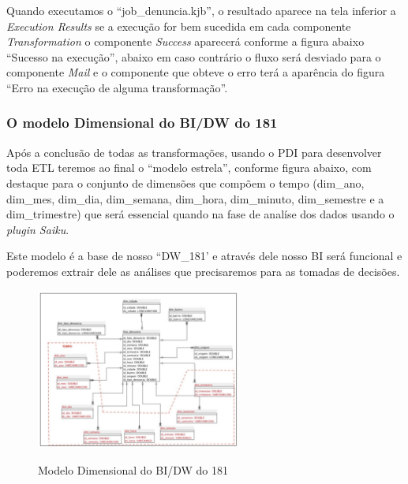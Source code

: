 Quando executamos o ``job\_denuncia.kjb'', o resultado aparece na tela inferior a \textit{Execution Results} se a execu\c{c}\~{a}o 
for bem sucedida em cada componente \textit{Transformation} o  componente \textit{Success} aparecer\'{a} conforme a 
figura abaixo ``Sucesso na execu\c{c}\~{a}o'', abaixo em caso contr\'{a}rio o fluxo ser\'{a} desviado para o 
componente \textit{Mail} e o componente que obteve o erro ter\'{a} a aparência do figura ``Erro na execu\c{c}\~{a}o de 
alguma transforma\c{c}\~{a}o''.

\subsubsection{O modelo Dimensional do BI/DW do 181}

Ap\'os a conclus\~{a}o de todas as transforma\c{c}\~{o}es, usando o PDI para desenvolver toda ETL teremos ao final o ``modelo estrela'', 
conforme figura abaixo, com destaque para o conjunto de dimens\~{o}es que comp\~{o}em o tempo (dim\_ano, dim\_mes, dim\_dia, dim\_semana, 
dim\_hora, dim\_minuto, dim\_semestre e a dim\_trimestre) que ser\'{a} essencial quando na fase de anal\'{i}se dos dados usando o \textit{plugin Saiku}. 

Este modelo \'{e} a base de nosso ``DW\_181' e atrav\'{e}s dele nosso BI ser\'{a} 
funcional e poderemos extrair dele as an\'{a}lises que precisaremos para as tomadas de decis\~{o}es.

\begin{figure}[H]
	\vspace*{0,2cm}
    \centering
    \caption{Modelo Dimensional do BI/DW do 181}
    \includegraphics[width=0.6\textwidth]{./04-figuras/figura-moddim}
    \label{fig:ilustfigmoddim}
\end{figure}
\vspace*{-0,9cm}
{\raggedright {}} 

